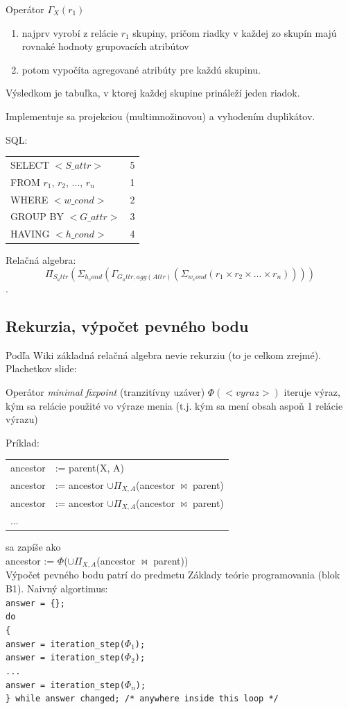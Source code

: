\documentclass[10pt,a4paper]{article}
\begin{document}
Operátor $\Gamma_X(r_1)$
\begin{enumerate}
\item najprv vyrobí z relácie $r_1$ skupiny, pričom riadky v každej zo
skupín majú rovnaké hodnoty grupovacích atribútov
\item potom vypočíta agregované atribúty pre každú skupinu.
\end{enumerate}
Výsledkom je tabuľka, v ktorej každej skupine prináleží jeden
riadok.
 
Implementuje sa projekciou (multimnožinovou) a vyhodením duplikátov. 

SQL:
\begin{tabular}{lc}
SELECT $<S\_attr>$ & 5 \\
FROM $r_1$, $r_2$, ..., $r_n$ & 1 \\
WHERE $<w\_cond>$ & 2 \\
GROUP BY $<G\_attr>$ & 3 \\
HAVING $<h\_cond>$ & 4 \\
\end{tabular}

Relačná algebra: 
$$\Pi_{S_attr}(\Sigma_{h_cond}(\Gamma_{G_attr, agg(Attr)}(\Sigma_{w_cond}(r_1 \times r_2 \times \ldots \times r_n))))$$.


\subsection{Rekurzia, výpočet pevného bodu}

Podľa Wiki základná relačná algebra nevie rekurziu (to je celkom zrejmé). 
Plachetkov slide: 

Operátor \emph{minimal fixpoint} (tranzitívny uzáver) $\Phi(<vyraz>)$ iteruje výraz, kým sa relácie použité vo výraze
menia (t.j. kým sa mení obsah aspoň 1 relácie výrazu)

Príklad:
\begin{tabular}{ll}
ancestor &:= parent(X, A) \\
ancestor &:= ancestor $\cup \Pi_{X,A}$(ancestor $\Join$ parent) \\
ancestor &:= ancestor $\cup \Pi_{X,A}$(ancestor $\Join$ parent) \\
... & \\
\end{tabular}
sa zapíše ako\\
ancestor := $\Phi$($\cup \Pi_{X,A}$(ancestor $\Join$ parent)) \\

Výpočet pevného bodu patrí do predmetu Základy teórie programovania (blok B1). 
Naivný algortimus: \\
\verb|answer = {};| \\
\verb|do| \\
\verb|{| \\
\verb|answer = iteration_step(|$\Phi_1$\verb|);| \\
\verb|answer = iteration_step(|$\Phi_2$\verb|);| \\
\verb|...| \\
\verb|answer = iteration_step(|$\Phi_n$\verb|);| \\
\verb|} while answer changed; /* anywhere inside this loop */| \\
\end{document}
